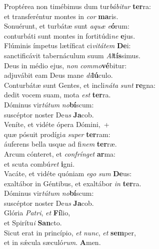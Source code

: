 \evenverse Proptérea non timébimus dum tur\textit{bá}\textit{bi}\textit{tur} \textbf{ter}ra:~\*\\
\evenverse et transferéntur montes in \textit{cor} \textbf{ma}ris.\\
\oddverse Sonuérunt, et turbátæ sunt \textit{a}\textit{quæ} \textit{e}\textbf{ó}rum:~\*\\
\oddverse conturbáti sunt montes in fortitúdi\textit{ne} \textbf{e}jus.\\
\evenverse Flúminis ímpetus lætíficat ci\textit{vi}\textit{tá}\textit{tem} \textbf{De}i:~\*\\
\evenverse sanctificávit tabernáculum suum \textit{Al}\textbf{tís}simus.\\
\oddverse Deus in médio ejus, \textit{non} \textit{com}\textit{mo}\textbf{vé}bitur:~\*\\
\oddverse adjuvábit eam Deus mane \textit{di}\textbf{lú}culo.\\
\evenverse Conturbátæ sunt Gentes, et incli\textit{ná}\textit{ta} \textit{sunt} \textbf{re}gna:~\*\\
\evenverse dedit vocem suam, mota \textit{est} \textbf{ter}ra.\\
\oddverse Dóminus vir\textit{tú}\textit{tum} \textit{no}\textbf{bí}scum:~\*\\
\oddverse suscéptor noster De\textit{us} \textbf{Ja}cob.\\
\evenverse Veníte, et vidéte ópera Dómini,~+\\
\evenverse  quæ pósuit prodígi\textit{a} \textit{su}\textit{per} \textbf{ter}ram:~\*\\
\evenverse áuferens bella usque ad fi\textit{nem} \textbf{ter}ræ.\\
\oddverse Arcum cónteret, et \textit{con}\textit{frín}\textit{get} \textbf{ar}ma:~\*\\
\oddverse et scuta combú\textit{ret} \textbf{i}gni.\\
\evenverse Vacáte, et vidéte quóniam \textit{e}\textit{go} \textit{sum} \textbf{De}us:~\*\\
\evenverse exaltábor in Géntibus, et exaltábor \textit{in} \textbf{ter}ra.\\
\oddverse Dóminus vir\textit{tú}\textit{tum} \textit{no}\textbf{bí}scum:~\*\\
\oddverse suscéptor noster De\textit{us} \textbf{Ja}cob.\\
\evenverse Glória \textit{Pa}\textit{tri}, \textit{et} \textbf{Fí}lio,~\*\\
\evenverse et Spirítu\textit{i} \textbf{San}cto.\\
\oddverse Sicut erat in princípio, \textit{et} \textit{nunc}, \textit{et} \textbf{sem}per,~\*\\
\oddverse et in sǽcula sæculó\textit{rum}. \textbf{A}men.\\
